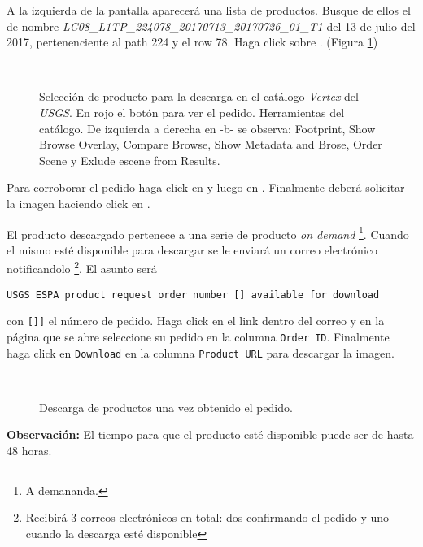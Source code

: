 A la izquierda de la pantalla aparecerá una lista de productos. Busque de ellos el de nombre \emph{LC08\_L1TP\_224078\_20170713\_20170726\_01\_T1
} del 13 de julio del 2017, pertenenciente al path 224 y el row 78. Haga click sobre . (Figura \ref{fig:descarga})

\begin{figure}[h!]
    \centering
    \\
    \caption{Selección de producto para la descarga en el catálogo \emph{Vertex} del \emph{USGS}. En rojo el botón para ver el pedido. Herramientas del catálogo. De izquierda a derecha en -b- se observa: Footprint, Show Browse Overlay, Compare Browse, Show Metadata and Brose, Order Scene  y Exlude escene from Results.}
    \label{fig:descarga}
\end{figure}

Para corroborar el pedido haga click en  y luego en . Finalmente deberá solicitar la imagen haciendo click en .

El producto descargado pertenece a una serie de producto \emph{on demand} \footnote{A demananda.}. Cuando el mismo esté disponible para descargar se le enviará un correo electrónico notificandolo \footnote{Recibirá 3 correos electrónicos en total: dos confirmando el pedido y uno cuando la descarga esté disponible}. El asunto será

\begin{center}
\texttt{USGS ESPA product request order number [] available for download}
\end{center}

con \texttt{[]]} el número de pedido. Haga click en el link dentro del correo y en la página que se abre seleccione su pedido en la columna \texttt{Order ID}. Finalmente haga click en \texttt{Download} en la columna \texttt{Product URL} para descargar la imagen.

\begin{figure}[h!]
    \centering
    \\
    \caption{Descarga de productos una vez obtenido el pedido.}
    \label{fig:descarga2}
\end{figure}

\textbf{Observación:} El tiempo para que el producto esté disponible puede ser de hasta 48 horas.

